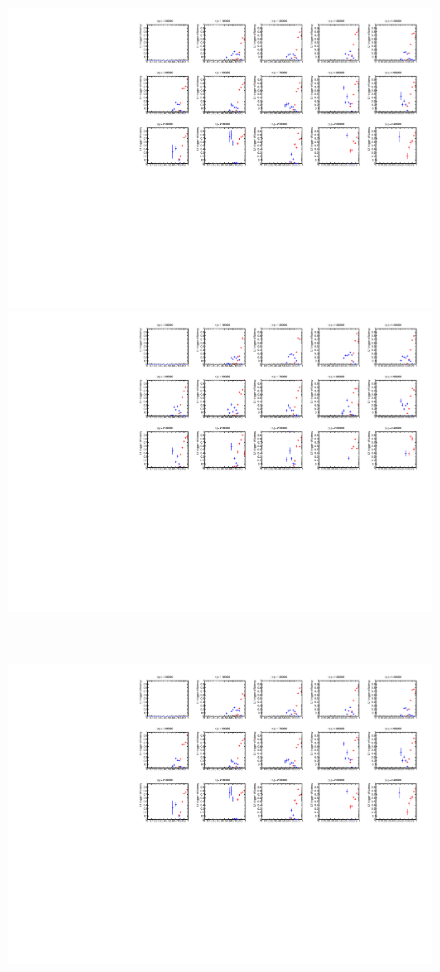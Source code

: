 \begin{figure}[tbp]
    \begin{minipage}{0.49\hsize}
    \centering   
    \includegraphics[width=\textwidth,page=4]{img/rec/stau_600.pdf}
    \end{minipage}
    \begin{minipage}{0.49\hsize}
    \centering   
    \includegraphics[width=\textwidth,page=4]{img/rec/stau_1000.pdf}
    \end{minipage}\\
    \begin{minipage}{0.49\hsize}
    \centering   
    \includegraphics[width=\textwidth,page=9]{img/rec/stau_600.pdf}

\end{minipage}
\end{figure}
